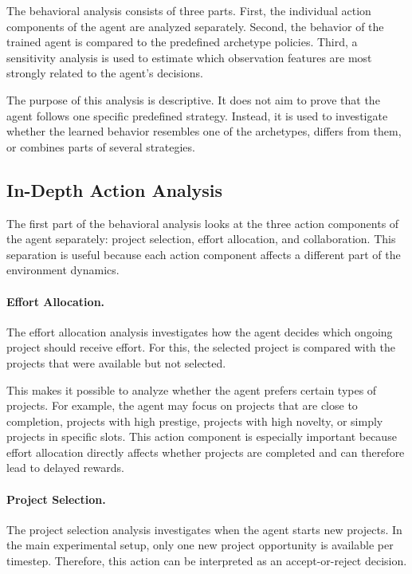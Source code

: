 \documentclass[english,bachelor]{hsluthesis}
\begin{document}
The behavioral analysis consists of three parts. First, the individual action components of the agent are analyzed separately. Second, the behavior of the trained agent is compared to the predefined archetype policies. Third, a sensitivity analysis is used to estimate which observation features are most strongly related to the agent's decisions.

The purpose of this analysis is descriptive. It does not aim to prove that the agent follows one specific predefined strategy. Instead, it is used to investigate whether the learned behavior resembles one of the archetypes, differs from them, or combines parts of several strategies.

\subsection{In-Depth Action Analysis}

The first part of the behavioral analysis looks at the three action components of the agent separately: project selection, effort allocation, and collaboration. This separation is useful because each action component affects a different part of the environment dynamics.

\paragraph{Effort Allocation.}
The effort allocation analysis investigates how the agent decides which ongoing project should receive effort. For this, the selected project is compared with the projects that were available but not selected.

This makes it possible to analyze whether the agent prefers certain types of projects. For example, the agent may focus on projects that are close to completion, projects with high prestige, projects with high novelty, or simply projects in specific slots. This action component is especially important because effort allocation directly affects whether projects are completed and can therefore lead to delayed rewards.

\paragraph{Project Selection.}
The project selection analysis investigates when the agent starts new projects. In the main experimental setup, only one new project opportunity is available per timestep. Therefore, this action can be interpreted as an accept-or-reject decision.
\end{document}
